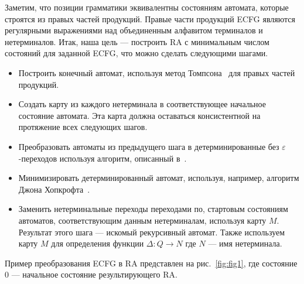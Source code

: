 \documentclass[12pt]{matmex-diploma-custom}
\begin{document}
	Заметим, что позиции грамматики эквивалентны состояниям автомата, которые 
	строятся из правых частей продукций. Правые части продукций ECFG являются регулярными
	выражениями над объединенным алфавитом терминалов и нетерминалов. Итак, наша цель ---
	построить RA с минимальным числом состояний для заданной ECFG, что можно сделать следующими шагами.
	\begin{itemize}
		\item Построить конечный автомат, используя метод Томпсона~\cite{Thompson:1968:PTR:363347.363387} для правых
		частей продукций.
		\item Создать карту из каждого нетерминала в соответствующее начальное состояние автомата.
		Эта карта должна оставаться консистентной на протяжение всех следующих шагов.
		\item Преобразовать автоматы из предыдущего шага в детерминированные без 
		$\varepsilon$-переходов используя алгоритм, описанный в~\cite{aho1974design}.
		\item Минимизировать детерминированный автомат, используя, например, алгоритм
		Джона Хопкрофта~\cite{hopcroft1971n}.
		\item Заменить нетерминальные переходы переходами по, стартовым состояниям автоматов,
		соответствующим данным нетерминалам, используя карту $M$. Результат 
		этого шага --- искомый рекурсивный автомат. Также используем карту $M$
		для определения функции $\Delta : Q \to N$ где $N$ --- имя нетерминала.
	\end{itemize}
	Пример преобразования ECFG в RA представлен на рис.~\ref{fig:fig1}, где состояние
	0 --- начальное состояние результирующего RA.
\end{document}

